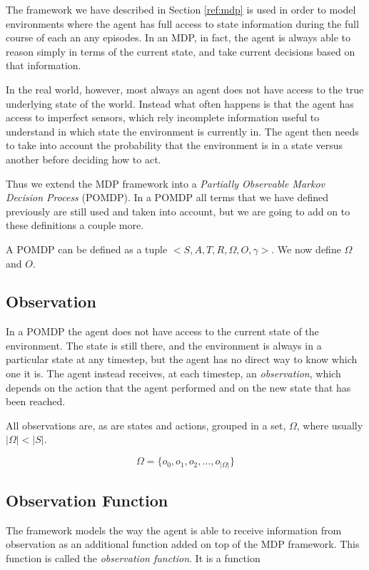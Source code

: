 The framework we have described in Section \ref{ref:mdp} is used in order to model environments
where the agent has full access to state information during the full course of each an any episodes.
In an MDP, in fact, the agent is always able to reason simply in terms of the current state, and
take current decisions based on that information.

In the real world, however, most always an agent does not have access to the true underlying state
of the world. Instead what often happens is that the agent has access to imperfect sensors, which
rely incomplete information useful to understand in which state the environment is currently in. The
agent then needs to take into account the probability that the environment is in a state versus another
before deciding how to act.

Thus we extend the MDP framework into a \textit{Partially Observable Markov Decision Process}
(POMDP). In a POMDP all terms that we have defined previously are still used and taken into account,
but we are going to add on to these definitions a couple more.

A POMDP can be defined as a tuple $<S,A,T,R,\Omega,O,\gamma>$. We now define $\Omega$ and $O$.

\subsection{Observation}\label{ref:obsspace}

In a POMDP the agent does not have access to the current state of the environment. The state is
still there, and the environment is always in a particular state at any timestep, but the agent has
no direct way to know which one it is. The agent instead receives, at each timestep, an
\textit{observation}, which depends on the action that the agent performed and on the new state that
has been reached.

All observations are, as are states and actions, grouped in a set, $\Omega$, where usually $|\Omega| <
|S|$.

\[ \Omega = \{ o_0, o_1, o_2, ..., o_{|\Omega|} \} \]

\subsection{Observation Function}

The framework models the way the agent is able to receive information from observation as an
additional function added on top of the MDP framework. This function is called the
\textit{observation function}. It is a function

